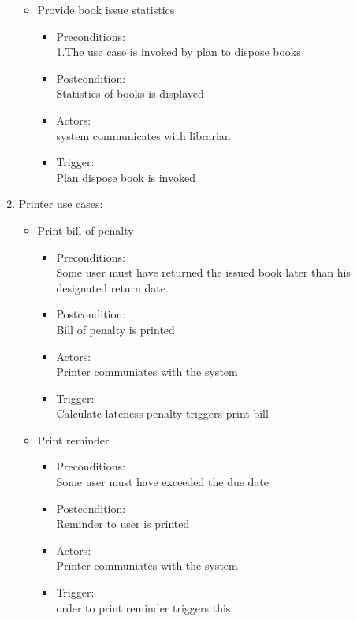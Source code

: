\documentclass{article}
\begin{document}
\begin{enumerate}
\begin{itemize}
 \item Provide book issue statistics
	\begin{itemize}
	\item  Preconditions:\\ 1.The use case is invoked by plan to dispose books\\ 
 \item Postcondition:\\ Statistics of books is displayed\\ 
 \item Actors: \\ system communicates with librarian\\ 
 \item Trigger:\\ Plan dispose book is invoked\\ 
	\end{itemize}

 \end{itemize}
\item Printer use cases:\\ 
\begin{itemize}
\item Print bill of penalty\\ 
\begin{itemize}
\item Preconditions:\\ Some user must have returned the issued book later than his designated return date.\\ 
 \item Postcondition:\\ Bill of penalty is printed\\ 
 \item Actors:\\  Printer communiates with the system\\ 
 \item Trigger:\\  Calculate lateness penalty triggers print bill\\ 
\end{itemize}

\item Print reminder\\ 
\begin{itemize}
\item  Preconditions:\\ Some user must have exceeded the due date\\ 
 \item Postcondition:\\ Reminder to user is printed\\ 
 \item Actors:\\  Printer communiates with the system\\ 
 \item Trigger:\\ order to print reminder triggers this\\ 
\end{itemize}


\end{itemize}
\end{enumerate}
\end{document}
